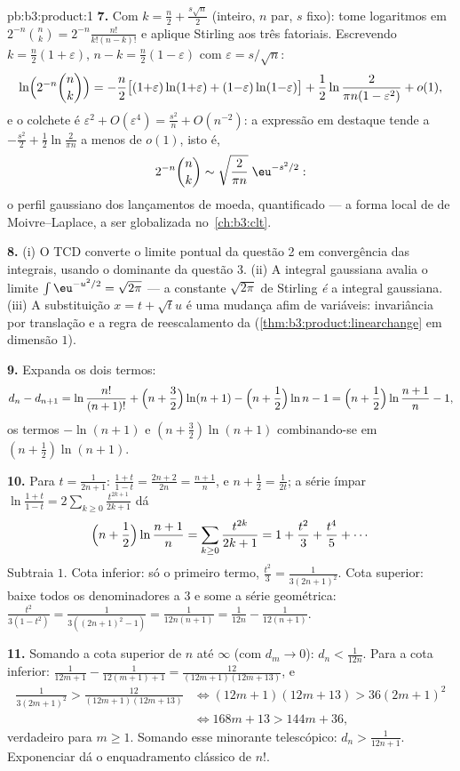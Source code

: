 \begin{solution}{pb:b3:product:1}
\textbf{7.} Com $k = \frac n2 + \frac{s\sqrt n}2$ (inteiro,
$n$ par, $s$ fixo): tome logaritmos em $2^{-n}\binom nk =
2^{-n}\frac{n!}{k!(n-k)!}$ e aplique Stirling aos três
fatoriais. Escrevendo $k = \frac n2(1 + \varepsilon)$, $n - k =
\frac n2(1 - \varepsilon)$ com $\varepsilon = s/\sqrt n$:
\[
\ln\Bigl(2^{-n}\binom nk\Bigr)
= -\frac n2\bigl[(1{+}\varepsilon)\ln(1{+}\varepsilon) +
(1{-}\varepsilon)\ln(1{-}\varepsilon)\bigr]
+ \frac12\ln\frac{2}{\pi n(1 - \varepsilon^2)} + o(1),
\]
e o colchete é $\varepsilon^2 + O(\varepsilon^4) =
\frac{s^2}n + O(n^{-2})$: a expressão em destaque tende a $-\frac{s^2}2 +
\frac12\ln\frac2{\pi n}$ a menos de $o(1)$, isto é,
\[
2^{-n}\binom nk \sim \sqrt{\frac{2}{\pi
n}}\;\eu^{-s^2/2} :
\]
o perfil gaussiano dos lançamentos de moeda, quantificado ---
a forma local de de Moivre--Laplace, a ser globalizada no~\cref{ch:b3:clt}.

\textbf{8.} (i) O TCD converte o limite pontual da questão 2
em convergência das integrais, usando o dominante da questão 3.
(ii) A integral gaussiana avalia o limite
$\int\eu^{-u^2/2} = \sqrt{2\pi}$ --- a constante
$\sqrt{2\pi}$ de Stirling \emph{é} a integral gaussiana. (iii) A
substituição $x = t + \sqrt tu$ é uma mudança afim de
variáveis: invariância por translação e a regra de reescalamento da
 (\cref{thm:b3:product:linearchange} em
dimensão $1$).

\textbf{9.} Expanda os dois termos:
\[
d_n - d_{n+1} = \ln\frac{n!}{(n+1)!} + \Bigl(n +
\frac32\Bigr)\ln(n+1) - \Bigl(n + \frac12\Bigr)\ln n - 1
= \Bigl(n + \frac12\Bigr)\ln\frac{n+1}n - 1,
\]
os termos $-\ln(n+1)$ e $(n + \frac32)\ln(n+1)$ combinando-se
em $(n + \frac12)\ln(n+1)$.

\textbf{10.} Para $t = \frac1{2n+1}$: $\frac{1+t}{1-t} =
\frac{2n+2}{2n} = \frac{n+1}n$, e $n + \frac12 =
\frac1{2t}$; a série ímpar $\ln\frac{1+t}{1-t} =
2\sum_{k\geq0}\frac{t^{2k+1}}{2k+1}$ dá
\[
\Bigl(n + \frac12\Bigr)\ln\frac{n+1}n
= \sum_{k\geq0}\frac{t^{2k}}{2k+1}
= 1 + \frac{t^2}3 + \frac{t^4}5 + \cdots
\]
Subtraia $1$. Cota inferior: só o primeiro termo,
$\frac{t^2}3 = \frac1{3(2n+1)^2}$. Cota superior: baixe todos os
denominadores a $3$ e some a série geométrica:
$\frac{t^2}{3(1 - t^2)} = \frac1{3((2n+1)^2 - 1)} =
\frac1{12n(n+1)} = \frac1{12n} - \frac1{12(n+1)}$.

\textbf{11.} Somando a cota superior de $n$ até $\infty$
(com $d_m \to 0$): $d_n < \frac1{12n}$. Para a cota inferior:
$\frac1{12m+1} - \frac1{12(m+1)+1} =
\frac{12}{(12m+1)(12m+13)}$, e
\begin{align*}
\frac1{3(2m+1)^2} > \frac{12}{(12m+1)(12m+13)}
&\iff (12m+1)(12m+13) > 36(2m+1)^2 \\
&\iff 168m + 13 > 144m + 36,
\end{align*}
verdadeiro para $m \geq 1$. Somando esse minorante telescópico:
$d_n > \frac1{12n+1}$. Exponenciar dá o enquadramento clássico
de $n!$.


\end{solution}
